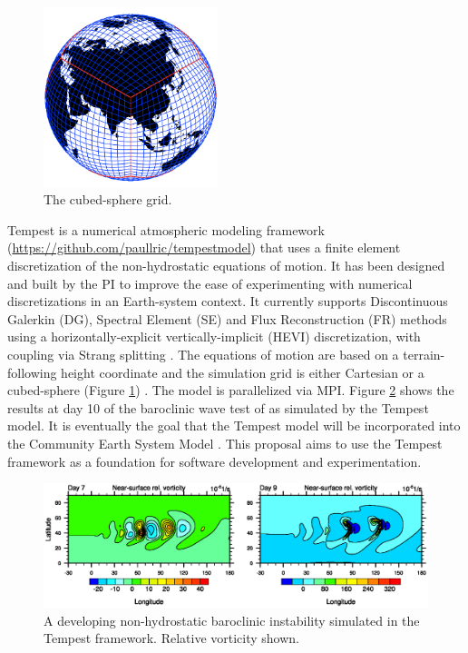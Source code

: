 \documentclass[11pt]{article}
\begin{document}
\begin{figure}
\begin{center}
\includegraphics[width=2in]{A_CubedSphere}
\end{center}
\caption{The cubed-sphere grid.} \label{fig:CubedSphere}
\end{figure}

Tempest is a numerical atmospheric modeling framework (\url{https://github.com/paullric/tempestmodel}) \citep{PAU2014MWR} that uses a finite element discretization of the non-hydrostatic equations of motion.  It has been designed and built by the PI to improve the ease of experimenting with numerical discretizations in an Earth-system context.  It currently supports Discontinuous Galerkin (DG), Spectral Element (SE) and Flux Reconstruction (FR) \citep{HTH2007AIAA} methods using a horizontally-explicit vertically-implicit (HEVI) discretization, with coupling via Strang splitting \citep{PAUCJ2012MWR}.  The equations of motion are based on a terrain-following height coordinate and the simulation grid is either Cartesian or a cubed-sphere (Figure \ref{fig:CubedSphere}) \citep{PAUCJBVL2010JCP,PAUCJ2012JCP}.  The model is parallelized via MPI.  Figure \ref{fig:TempestBaroclinicInstability} shows the results at day 10 of the baroclinic wave test of \cite{PAUTMCJAS2013QJRMS} as simulated by the Tempest model.  It is eventually the goal that the Tempest model will be incorporated into the Community Earth System Model \citep{JWHetal2013BAMS}.  This proposal aims to use the Tempest framework as a foundation for software development and experimentation.

\begin{figure}
\begin{center}
\includegraphics[width=6in]{UMJSTest-Results}
\end{center}
\caption{A developing non-hydrostatic baroclinic instability simulated in the Tempest framework.  Relative vorticity shown.} \label{fig:TempestBaroclinicInstability}
\end{figure}
\end{document}
